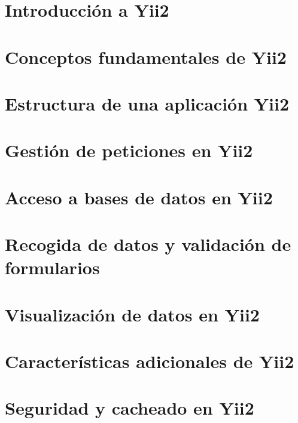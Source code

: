 \documentclass[a4paper,11pt,spanish]{sphinxmanual}
\begin{document}
\chapter{Introducción a Yii2}
\label{\detokenize{yii2:introduccion-a-yii2}}

\chapter{Conceptos fundamentales de Yii2}
\label{\detokenize{yii2:conceptos-fundamentales-de-yii2}}

\chapter{Estructura de una aplicación Yii2}
\label{\detokenize{yii2:estructura-de-una-aplicacion-yii2}}

\chapter{Gestión de peticiones en Yii2}
\label{\detokenize{yii2:gestion-de-peticiones-en-yii2}}

\chapter{Acceso a bases de datos en Yii2}
\label{\detokenize{yii2:acceso-a-bases-de-datos-en-yii2}}

\chapter{Recogida de datos y validación de formularios}
\label{\detokenize{yii2:recogida-de-datos-y-validacion-de-formularios}}

\chapter{Visualización de datos en Yii2}
\label{\detokenize{yii2:visualizacion-de-datos-en-yii2}}

\chapter{Características adicionales de Yii2}
\label{\detokenize{yii2:caracteristicas-adicionales-de-yii2}}

\chapter{Seguridad y cacheado en Yii2}
\label{\detokenize{yii2:seguridad-y-cacheado-en-yii2}}
\end{document}
